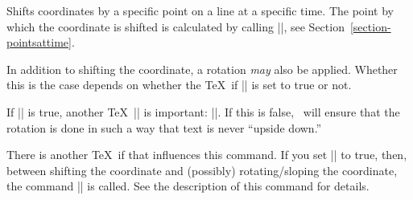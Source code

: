   
\begin{command}{\pgftransformlineattime{}}
  Shifts coordinates by a specific point on a line at a specific
  time. The point by which the coordinate is shifted is calculated by
  calling |\pgfpointlineattime|, see
  Section~\ref{section-pointsattime}.

  In addition to shifting the coordinate, a rotation \emph{may} also
  be applied. Whether this is the case depends on whether the \TeX\ if
  |\ifpgfslopedattime| is set to true or not.
\begin{codeexample}[]
\end{codeexample}
\begin{codeexample}[]
\end{codeexample}
  If |\ifpgfslopedattime| is true, another \TeX\ |\if| is important:
  |\ifpgfallowupsidedowattime|. If this is false, \pgfname\ will
  ensure that the rotation is done in such a way that text is never
  ``upside down.''

  There is another \TeX\ if that influences this command. If you set
  |\ifpgfresetnontranslationattime| to true, then, between
  shifting the coordinate and (possibly) rotating/sloping the
  coordinate, the command |\pgftransformresetnontranslations| is
  called. See the description of this command for details.
\begin{codeexample}[]
\end{codeexample}
\begin{codeexample}[]
\end{codeexample}
\end{command}


